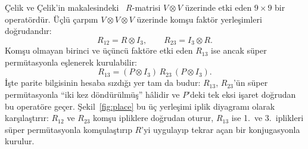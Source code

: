 \documentclass[12pt,a4paper,fleqn]{report}
\numberwithin{equation}{chapter}
\theoremstyle{plain}
\theoremstyle{definition}
\begin{document}
Çelik ve Çelik'in makalesindeki~\cite{CelikGL21} $R$-matrisi $V\otimes V$ üzerinde etki eden $9\times 9$ bir
operatördür. Üçlü çarpım $V\otimes V\otimes V$ üzerinde komşu faktör
yerleşimleri doğrudandır:
\begin{equation}
R_{12}=R\otimes I_3,\qquad R_{23}=I_3\otimes R.
\end{equation}
Komşu olmayan birinci ve üçüncü faktöre etki eden $R_{13}$ ise ancak süper
permütasyonla eşlenerek kurulabilir:
\begin{equation}
R_{13}=(P\otimes I_3)\,R_{23}\,(P\otimes I_3).
\end{equation}
İşte parite bilgisinin hesaba sızdığı yer tam da budur: $R_{13}$, $R_{23}$'ün
süper permütasyonla ``iki kez döndürülmüş'' hâlidir ve $P$'deki tek eksi işaret
doğrudan bu operatöre geçer. Şekil~\ref{fig:place} bu üç yerleşimi iplik
diyagramı olarak karşılaştırır: $R_{12}$ ve $R_{23}$ komşu ipliklere doğrudan
oturur, $R_{13}$ ise 1.\ ve 3.\ iplikleri süper permütasyonla komşulaştırıp
$R$'yi uygulayıp tekrar açan bir konjugasyonla kurulur.
\end{document}
